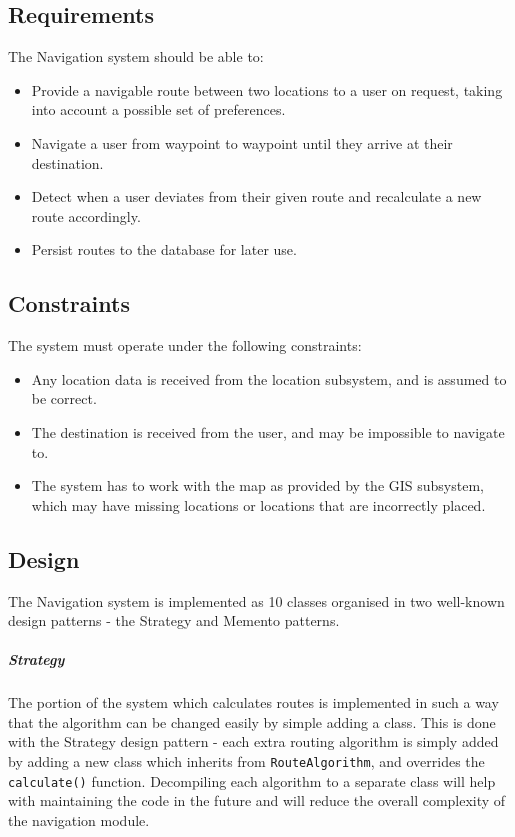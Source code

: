 \documentclass[english]{article}
\begin{document}
       \subsection{Requirements}
            The Navigation system should be able to:
            \begin{itemize}
                \item Provide a navigable route between two locations to a user on request, taking into account a possible set of preferences.
                \item Navigate a user from waypoint to waypoint until they arrive at their destination.
                \item Detect when a user deviates from their given route and recalculate a new route accordingly.
                \item Persist routes to the database for later use.
            \end{itemize}

        \subsection{Constraints}
            The system must operate under the following constraints:
            \begin{itemize}
                \item Any location data is received from the location subsystem, and is assumed to be correct.
                \item The destination is received from the user, and may be impossible to navigate to.
                \item The system has to work with the map as provided by the GIS subsystem, which may have missing locations or locations that are incorrectly placed.
            \end{itemize}

        \subsection{Design}
            The Navigation system is implemented as 10 classes organised in two well-known design patterns - the Strategy and Memento patterns.

            \subparagraph{Strategy}
            The portion of the system which calculates routes is implemented in such a way that the algorithm can be changed easily by simple adding a class. This is done with the Strategy design pattern - each extra routing algorithm is simply added by adding a new class which inherits from \texttt{RouteAlgorithm}, and overrides the \texttt{calculate()} function. Decompiling each algorithm to a separate class will help with maintaining the code in the future and will reduce the overall complexity of the navigation module.
\end{document}
